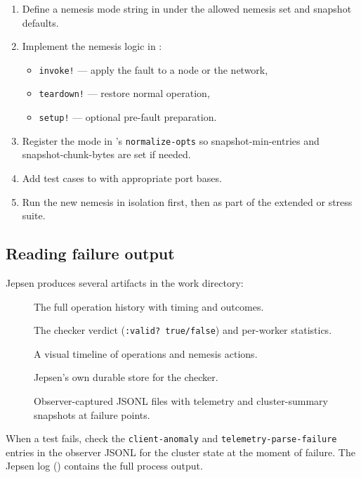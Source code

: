 \begin{enumerate}
\item Define a nemesis mode string in  under the allowed
nemesis set and snapshot defaults.
\item Implement the nemesis logic in :
  \begin{itemize}
  \item \texttt{invoke!} --- apply the fault to a node or the network,
  \item \texttt{teardown!} --- restore normal operation,
  \item \texttt{setup!} --- optional pre-fault preparation.
  \end{itemize}
\item Register the mode in 's \texttt{normalize-opts}
so snapshot-min-entries and snapshot-chunk-bytes are set if needed.
\item Add test cases to  with appropriate port bases.
\item Run the new nemesis in isolation first, then as part of the extended
or stress suite.
\end{enumerate}

\subsection{Reading failure output}

Jepsen produces several artifacts in the work directory:

\begin{description}
\item[] The full operation history with timing and outcomes.
\item[] The checker verdict (\texttt{:valid? true/false})
and per-worker statistics.
\item[] A visual timeline of operations and nemesis actions.
\item[] Jepsen's own durable store for the checker.
\item[] Observer-captured JSONL files with telemetry
and cluster-summary snapshots at failure points.
\end{description}

When a test fails, check the \texttt{client-anomaly} and
\texttt{telemetry-parse-failure} entries in the observer JSONL for the
cluster state at the moment of failure. The Jepsen log
() contains the full process output.

